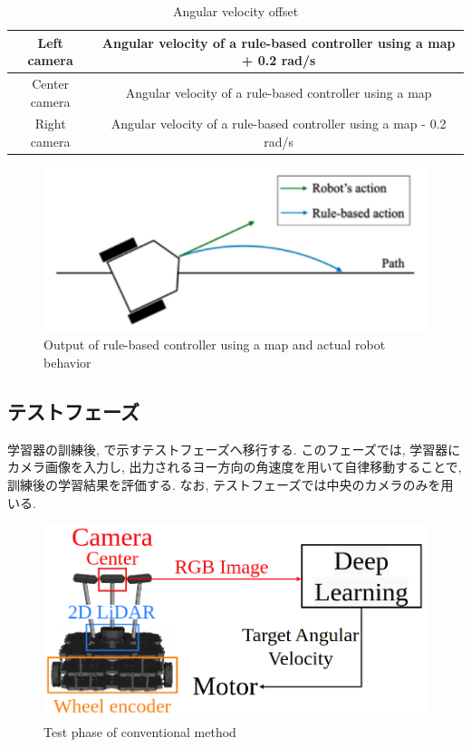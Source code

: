 \begin{table}[hbtp]
  \caption{Angular velocity offset}
  \label{table:angular}
  \centering
  \begin{tabular}{|c|c|}
    \hline
    Left camera  & Angular velocity of a rule-based controller using a map + 0.2 rad/s\\
    \hline
    Center camera  & Angular velocity of a rule-based controller using a map  \\
    \hline
    Right camera  & Angular velocity of a rule-based controller using a map - 0.2 rad/s   \\
    \hline
  \end{tabular}
\end{table}

\begin{figure}[hbtp]
  \centering
 \includegraphics[keepaspectratio, scale=0.4]
      {images/dakou.png}
 \caption{Output of rule-based controller using a map and actual robot behavior}
 \label{Fig:dakou}
\end{figure}

\subsection{テストフェーズ}
学習器の訓練後, で示すテストフェーズへ移行する. このフェーズでは, 学習器にカメラ画像を入力し, 出力されるヨー方向の角速度を用いて自律移動することで, 訓練後の学習結果を評価する. なお, テストフェーズでは中央のカメラのみを用いる.

\vspace{3cm}


\begin{figure}[hbtp]
  \centering
 \includegraphics[keepaspectratio, scale=0.4]
      {images/test_phase2.png}
 \caption{Test phase of conventional method}
 \label{Fig:test_phase}
\end{figure}


\newpage